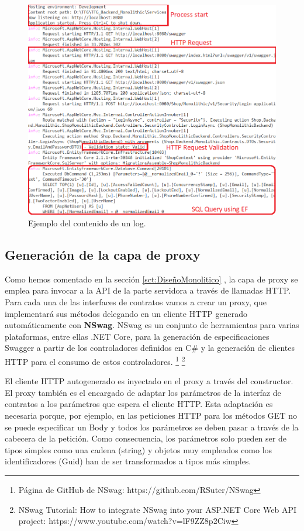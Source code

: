 \documentclass[11pt,spanish,listoffigures]{tfgetsinf}
\begin{document}
\begin{figure}[h]
\centering
\includegraphics[scale=0.5]{logging}
\caption{Ejemplo del contenido de un log.}
\end{figure}

\subsection{Generación de la capa de proxy}

Como hemos comentado en la sección \ref{sct:DiseñoMonolitico} , la capa de proxy se emplea para invocar a la API de la parte servidora a través de llamadas HTTP. Para cada una de las interfaces de contratos vamos a crear un proxy, que implementará sus métodos delegando en un cliente HTTP generado automáticamente con \textbf{NSwag}. NSwag es un conjunto de herramientas para varias plataformas, entre ellas .NET Core, para la generación de especificaciones Swagger a partir de los controladores definidos en C\# y la generación de clientes HTTP para el consumo de estos controladores. \footnote{ Página de GitHub de NSwag: https://github.com/RSuter/NSwag} \footnote{ NSwag Tutorial: How to integrate NSwag into your ASP.NET Core Web API project: https://www.youtube.com/watch?v=lF9ZZ8p2Ciw}

El cliente HTTP autogenerado es inyectado en el proxy a través del constructor. El proxy también es el encargado de adaptar los parámetros de la interfaz de contratos a los parámetros que espera el cliente HTTP. Esta adaptación es necesaria porque, por ejemplo, en las peticiones HTTP para los métodos GET no se puede especificar un Body y todos los parámetros se deben pasar a través de la cabecera de la petición. Como consecuencia, los parámetros solo pueden ser de tipos simples como una cadena (string) y objetos muy empleados como los identificadores (Guid) han de ser transformados a tipos más simples.
\end{document}
